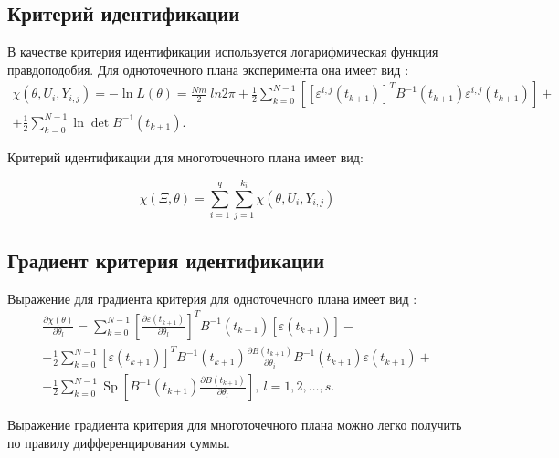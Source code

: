 \documentclass[a4paper,14pt]{extarticle}
\DeclareMathOperator{\Sp}{Sp}
\newcommand{\eps}{\varepsilon}
\begin{document}
\subsection{Критерий идентификации}

В качестве критерия идентификации используется логарифмическая функция
правдоподобия. Для одноточечного плана эксперимента она имеет вид \cite{mono}:
\begin{equation*}
\begin{split}
	\chi(\theta, U_i, Y_{i,j}) = -\ln{L(\theta)} =
	\frac{Nm}{2}\ ln{2\pi} + \frac{1}{2}
	\sum\limits_{k=0}^{N-1} \left[ [\eps^{i,j}(t_{k+1})]^T 
	B^{-1}(t_{k+1}) \eps^{i,j}(t_{k+1}) \right]
  + \\ + \frac{1}{2} \sum\limits_{k=0}^{N-1} \ln \det B^{-1}(t_{k+1}).
\end{split}
\end{equation*}

Критерий идентификации для многоточечного плана имеет вид:

\begin{equation*}
	\chi(\Xi, \theta) =
		\sum\limits_{i=1}^{q} \sum\limits_{j=1}^{k_i} \chi(\theta, U_i, Y_{i,j})
\end{equation*}

\subsection{Градиент критерия идентификации}

Выражение для градиента критерия для одноточечного плана имеет вид \cite{mono}:
\begin{equation*}
\begin{split}
  \frac{\partial \chi(\theta)}{\partial \theta_l} = \sum\limits_{k=0}^{N-1}
  \left[ \frac{\partial \eps(t_{k+1})}{\partial \theta_l} \right]^T
  B^{-1}(t_{k+1}) \left[ \eps(t_{k+1}) \right] - \\
  - \frac{1}{2}
  \sum\limits_{k=0}^{N-1} \left[ \eps(t_{k+1}) \right]^T B^{-1}(t_{k+1})
  \frac{\partial B(t_{k+1})}{\partial \theta_i} B^{-1}(t_{k+1}) \eps(t_{k+1}) +
  \\ + 
  \frac{1}{2} \sum\limits_{k=0}^{N-1} \Sp \left[ B^{-1}(t_{k+1})
  \frac{\partial B(t_{k+1})}{\partial \theta_l} \right],\ l = 1, 2, \ldots, s.
\end{split}
\end{equation*}

Выражение градиента критерия для многоточечного плана можно легко получить по
правилу дифференцирования суммы.
\end{document}
